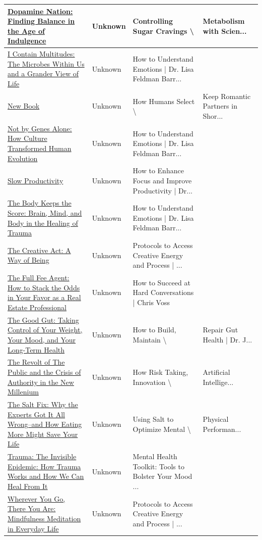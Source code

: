 \documentclass{article}
\begin{document}
\begin{longtable}{|p{6cm}|p{4cm}|p{4cm}|}
\hline
\href{https://amzn.to/3ipnI7o}{Dopamine Nation: Finding Balance in the Age of Indulgence} & Unknown & Controlling Sugar Cravings \textbackslash{}& Metabolism with Scien... \\
\hline
\href{https://amzn.to/3M2CY9B}{I Contain Multitudes: The Microbes Within Us and a Grander View of Life} & Unknown & How to Understand Emotions | Dr. Lisa Feldman Barr... \\
\hline
\href{https://amzn.to/3FThTsG}{New Book} & Unknown & How Humans Select \textbackslash{}& Keep Romantic Partners in Shor... \\
\hline
\href{https://amzn.to/3QirDEZ}{Not by Genes Alone: How Culture Transformed Human Evolution} & Unknown & How to Understand Emotions | Dr. Lisa Feldman Barr... \\
\hline
\href{https://amzn.to/49QzG35}{Slow Productivity} & Unknown & How to Enhance Focus and Improve Productivity | Dr... \\
\hline
\href{https://amzn.to/3QirDEZ}{The Body Keeps the Score: Brain, Mind, and Body in the Healing of Trauma} & Unknown & How to Understand Emotions | Dr. Lisa Feldman Barr... \\
\hline
\href{https://amzn.to/48qgkAA}{The Creative Act: A Way of Being} & Unknown & Protocols to Access Creative Energy and Process | ... \\
\hline
\href{https://amzn.to/3Nhe9Hp}{The Full Fee Agent: How to Stack the Odds in Your Favor as a Real Estate Professional} & Unknown & How to Succeed at Hard Conversations | Chris Voss \\
\hline
\href{https://amzn.to/35RQP0c}{The Good Gut: Taking Control of Your Weight, Your Mood, and Your Long-Term Health} & Unknown & How to Build, Maintain \textbackslash{}& Repair Gut Health | Dr. J... \\
\hline
\href{https://amzn.to/45BqNYW}{The Revolt of The Public and the Crisis of Authority in the New Millenium} & Unknown & How Risk Taking, Innovation \textbackslash{}& Artificial Intellige... \\
\hline
\href{https://amzn.to/3CD1KHi}{The Salt Fix: Why the Experts Got It All Wrong--and How Eating More Might Save Your Life} & Unknown & Using Salt to Optimize Mental \textbackslash{}& Physical Performan... \\
\hline
\href{https://amzn.to/3GVLHXw}{Trauma: The Invisible Epidemic: How Trauma Works and How We Can Heal From It} & Unknown & Mental Health Toolkit: Tools to Bolster Your Mood ... \\
\hline
\href{https://amzn.to/48qgkAA}{Wherever You Go, There You Are: Mindfulness Meditation in Everyday Life} & Unknown & Protocols to Access Creative Energy and Process | ... \\

\end{longtable}
\end{document}
